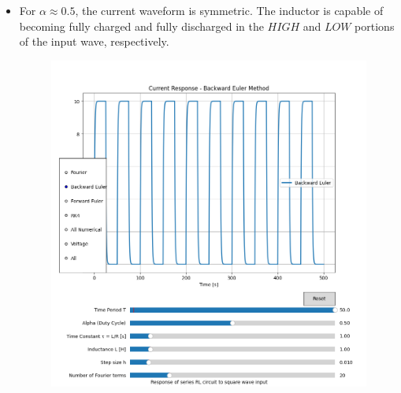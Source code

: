 \documentclass[12pt,a4paper]{report}
\begin{document}
\begin{itemize}
\begin{itemize}
\begin{figure}[h!]
        \end{figure}
        \item For $\alpha \approx 0.5$, the current waveform is symmetric. The inductor is capable of becoming fully charged and fully discharged in the $HIGH$ and $LOW$ portions of the input wave, respectively. 
        \pagebreak
        \begin{figure}[h!]
	   \centering
	   \includegraphics[scale=0.6]{figs/tau<<T-2.png}
        \end{figure} 
        

\end{itemize}
\end{itemize}
\end{document}
